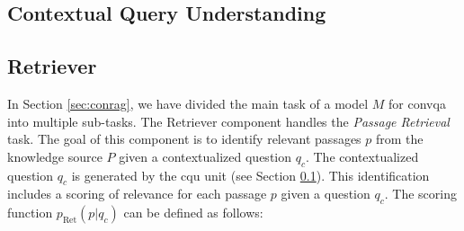 








\subsection{Contextual Query Understanding}
\label{subsec:cqu}



\subsection{Retriever}
\label{subsec:retriever}

In Section \ref{sec:conrag}, we have divided the main task of a model $M$ for \gls{convqa} into multiple sub-tasks. The Retriever component handles the \textit{Passage Retrieval} task. The goal of this component is to identify relevant passages $p$ from the knowledge source $P$ given a contextualized question $q_c$. The contextualized question $q_c$ is generated by the \gls{cqu} unit (see Section \ref{subsec:cqu}). This identification includes a scoring of relevance for each passage $p$ given a question $q_c$. The scoring function $p_{\text{Ret}}(p|q_c)$ can be defined as follows:

